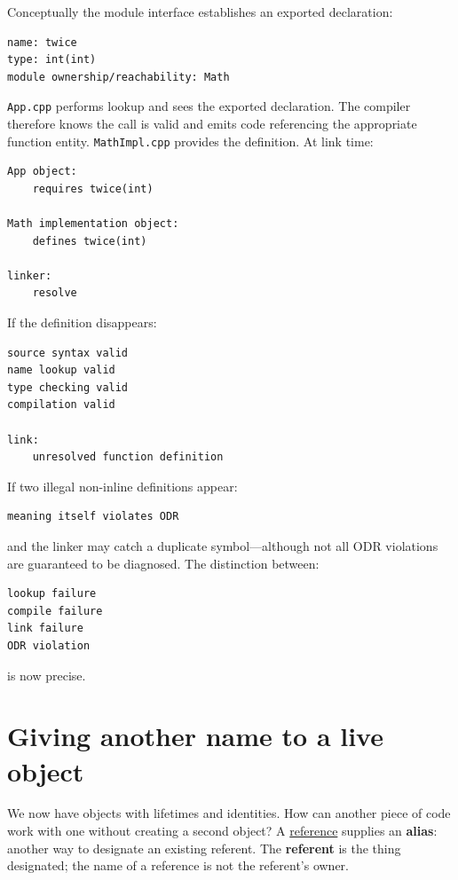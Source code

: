 Conceptually the module interface establishes an exported declaration:

\begin{verbatim}
name: twice
type: int(int)
module ownership/reachability: Math
\end{verbatim}

\texttt{App.cpp} performs lookup and sees the exported declaration. The compiler therefore knows the call is valid and emits code referencing the appropriate function entity. \texttt{MathImpl.cpp} provides the definition. At link time:

\begin{verbatim}
App object:
    requires twice(int)

Math implementation object:
    defines twice(int)

linker:
    resolve
\end{verbatim}

If the definition disappears:

\begin{verbatim}
source syntax valid
name lookup valid
type checking valid
compilation valid

link:
    unresolved function definition
\end{verbatim}

If two illegal non-inline definitions appear:

\begin{verbatim}
meaning itself violates ODR
\end{verbatim}

and the linker may catch a duplicate symbol---although not all ODR violations are guaranteed to be diagnosed. The distinction between:

\begin{verbatim}
lookup failure
compile failure
link failure
ODR violation
\end{verbatim}

is now precise.

\section{Giving another name to a live object}\label{01-foundations-i-ch003-giving-another-name-to-a-live-object}

\hypertarget{01-foundations-i-ch003-giving-another-name-to-a-live-object}{}

We now have objects with lifetimes and identities. How can another piece of code work with one without creating a second object? A \hyperref[appendix-d6d562ca9fbb]{reference} supplies an \textbf{alias}: another way to designate an existing referent. The \textbf{referent} is the thing designated; the name of a reference is not the referent's owner.

